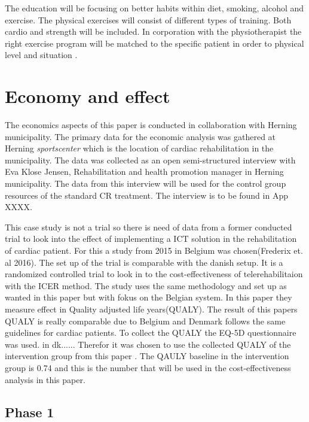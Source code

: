 The education will be focusing on better habits within diet, smoking, alcohol and exercise. The physical exercises will consist of different types of training. Both cardio and strength will be included. In corporation with the physiotherapist the right exercise program will be matched to the specific patient in order to physical level and situation \cite{herning}. 



\section{Economy and effect}

The economics aspects of this paper is conducted in collaboration with Herning municipality. The primary data for the economic analysis was gathered at Herning \textit{sportscenter} which is the location of cardiac rehabilitation in the municipality. The data was collected as an open semi-structured interview with Eva Klose Jensen, Rehabilitation and health promotion manager in Herning municipality. The data from this interview will be used for the control group resources of the standard CR treatment. The interview is to be found in App XXXX. 

This case study is not a trial so there is need of data from a former conducted trial to look into the effect of implementing a ICT solution in the rehabilitation of cardiac patient. For this a study from 2015 in Belgium was chosen(Frederix et. al 2016). The set up of the trial is comparable with the danish setup. It is a randomized controlled trial to look in to the cost-effectiveness of telerehabilitaion with the ICER method. The study uses the same methodology and set up as wanted in this paper but with fokus on the Belgian system. In this paper they measure effect in Quality adjusted life years(QUALY). The result of this papers QUALY is really comparable due to Belgium and Denmark follows the same guidelines for cardiac patients. To collect the QUALY the EQ-5D questionnaire was used. in dk......
Therefor it was chosen to use the collected QUALY of the intervention group from this paper \cite{costeffect}.
The QAULY baseline in the intervention group is 0.74 and this is the number that will be used in the cost-effectiveness analysis in this paper. 

\subsection{Phase 1}

